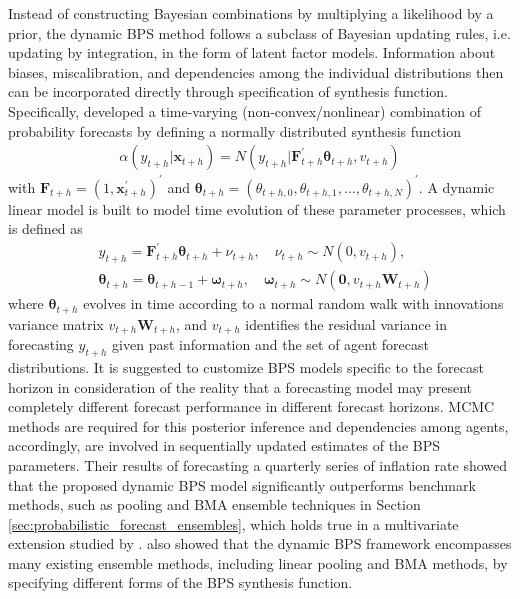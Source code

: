 \documentclass[11pt]{article}
\begin{document}
Instead of constructing Bayesian combinations by multiplying a likelihood by a prior, the dynamic BPS method follows a subclass of Bayesian updating rules, i.e. updating by integration, in the form of latent factor models. Information about biases, miscalibration, and dependencies among the individual distributions then can be incorporated directly through specification of synthesis function. Specifically, \cite{McAlinn2019-kn} developed a time-varying (non-convex/nonlinear) combination of probability forecasts by defining a normally distributed synthesis function
\begin{align*}
\alpha\left(y_{t+h} | \boldsymbol{x}_{t+h}\right)=N\left(y_{t+h} | \boldsymbol{F}_{t+h}^{\prime} \boldsymbol{\theta}_{t+h}, v_{t+h}\right)
\end{align*}
with $\boldsymbol{F}_{t+h}=\left(1, \boldsymbol{x}_{t+h}^{\prime}\right)^{\prime}$ and $\boldsymbol{\theta}_{t+h}=\left(\theta_{t+h, 0}, \theta_{t+h, 1}, \ldots, \theta_{t+h, N}\right)^{\prime}$. A dynamic linear model is built to model time evolution of these parameter processes, which is defined as
\begin{align*}
&y_{t+h}=\boldsymbol{F}_{t+h}^{\prime} \boldsymbol{\theta}_{t+h}+\nu_{t+h}, \quad \nu_{t+h} \sim N\left(0, v_{t+h}\right), \\
&\boldsymbol{\theta}_{t+h}=\boldsymbol{\theta}_{t+h-1}+\boldsymbol{\omega}_{t+h}, \quad \boldsymbol{\omega}_{t+h} \sim N\left(\boldsymbol{0}, v_{t+h} \boldsymbol{W}_{t+h}\right)
\end{align*}
where $\boldsymbol{\theta}_{t+h}$ evolves in time according to a normal random walk with innovations variance matrix $v_{t+h} \boldsymbol{W}_{t+h}$, and $v_{t+h}$ identifies the residual variance in forecasting $y_{t+h}$ given past information and the set of agent forecast distributions. It is suggested to customize BPS models specific to the forecast horizon in consideration of the reality that a forecasting model may present completely different forecast performance in different forecast horizons. MCMC methods are required for this posterior inference and dependencies among agents, accordingly, are involved in sequentially updated estimates of the BPS parameters. Their results of forecasting a quarterly series of inflation rate showed that the proposed dynamic BPS model significantly outperforms benchmark methods, such as pooling and BMA ensemble techniques in Section \ref{sec:probabilistic_forecast_ensembles}, which holds true in a multivariate extension studied by \cite{McAlinn2020-qq}. \cite{McAlinn2019-kn} also showed that the dynamic BPS framework encompasses many existing ensemble methods, including linear pooling and BMA methods, by specifying different forms of the BPS synthesis function.
\end{document}
